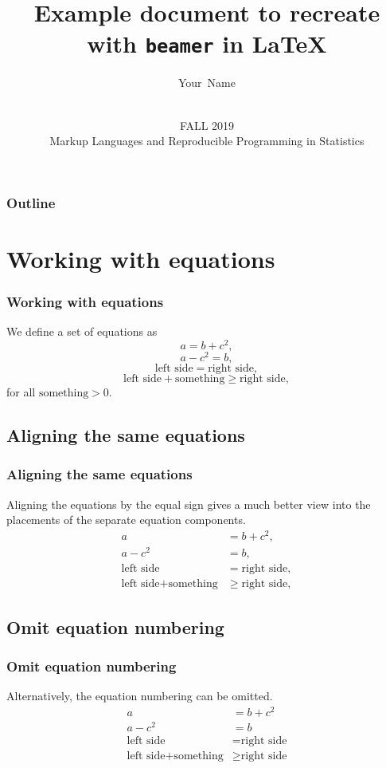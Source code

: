 \documentclass[aspectratio=169]{beamer} %
\title[Example] {Example document to recreate with \texttt{beamer} in \LaTeX}
\author[Your Name]
{
 Your~Name
}
\date[MLRPS]
{\vspace{.5 in}\\ FALL 2019 \\ Markup Languages and Reproducible Programming in Statistics  \vskip6mm}
\begin{document}
\titlepage

\begin{frame}
\frametitle{Outline}
\tableofcontents
\end{frame}

\section{Working with equations}
\begin{frame}
\frametitle{Working with equations}
    We define a set of equations as
    \begin{equation}
        a=b+c^2,
    \end{equation}
    \begin{equation}
    	a-c^2=b,
    \end{equation}
    \begin{equation}
    	\text{left side} = \text{right side},
    \end{equation}
    \begin{equation}
    	\text{left side} + \text{something} \geq \text{right side},
    \end{equation}
    for all $\text{something} > 0$. 
\end{frame}

\subsection{Aligning the same equations}
\begin{frame}
\frametitle{Aligning the same equations}
    Aligning the equations by the equal sign gives a much better view into the placements of the separate equation components. 
    \begin{align}
    	a&=b+c^2,\\
    	a-c^2&=b,\\
    	\text{left side} &= \text{right side},\\
    	\text{left side} + \text{something} & \geq \text{right side},
    \end{align}
\end{frame}

\subsection{Omit equation numbering}
\begin{frame}
\frametitle{Omit equation numbering}
    Alternatively, the equation numbering can be omitted. 
    \begin{align*}
    	a&=b+c^2\\
    	a-c^2&=b\\
    	\text{left side} &= \text{right side}\\
    	\text{left side} + \text{something} & \geq \text{right side}
    \end{align*}
\end{frame}
\end{document}
